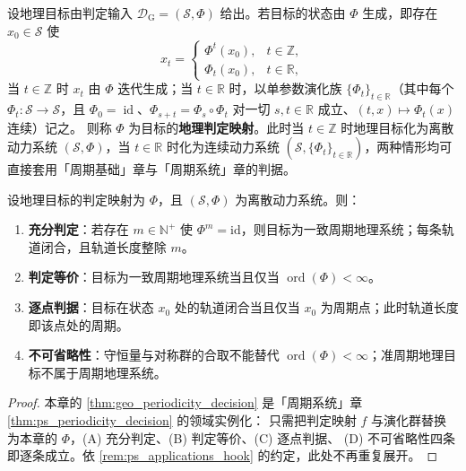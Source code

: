 \begin{definition}[地理判定映射]\label{def:geo_periodization}
设地理目标由判定输入 $\mathcal D_{\mathrm{G}}=(\mathcal S,\Phi)$ 给出。若目标的状态由 $\Phi$ 生成，即存在 $x_0\in\mathcal S$ 使
\[
x_t=\begin{cases}\Phi^t(x_0), & t\in\mathbb Z,\\ \Phi_t(x_0), & t\in\mathbb R,\end{cases}
\]
当 $t\in\mathbb Z$ 时 $x_t$ 由 $\Phi$ 迭代生成；当 $t\in\mathbb R$ 时，以单参数演化族 $\{\Phi_t\}_{t\in\mathbb R}$（其中每个 $\Phi_t:\mathcal S\to\mathcal S$，且 $\Phi_0=\operatorname{id}$、$\Phi_{s+t}=\Phi_s\circ\Phi_t$ 对一切 $s,t\in\mathbb R$ 成立、$(t,x)\mapsto\Phi_t(x)$ 连续）记之。
则称 $\Phi$ 为目标的\textbf{地理判定映射}。此时当 $t\in\mathbb Z$ 时地理目标化为离散动力系统 $(\mathcal S,\Phi)$，当 $t\in\mathbb R$ 时化为连续动力系统 $(\mathcal S,\{\Phi_t\}_{t\in\mathbb R})$，两种情形均可直接套用「周期基础」章与「周期系统」章的判据。
\end{definition}

\begin{theorem}[地理周期性判定定理]\label{thm:geo_periodicity_decision}
设地理目标的判定映射为 $\Phi$，且 $(\mathcal S,\Phi)$ 为离散动力系统。则：
\begin{enumerate}[label=(\Alph*)]
    \item \textbf{充分判定}：若存在 $m\in\mathbb N^+$ 使 $\Phi^m=\mathrm{id}$，则目标为一致周期地理系统；每条轨道闭合，且轨道长度整除 $m$。
    \item \textbf{判定等价}：目标为一致周期地理系统当且仅当 $\operatorname{ord}(\Phi)<\infty$。
    \item \textbf{逐点判据}：目标在状态 $x_0$ 处的轨道闭合当且仅当 $x_0$ 为周期点；此时轨道长度即该点处的周期。
    \item \textbf{不可省略性}：守恒量与对称群的合取不能替代 $\operatorname{ord}(\Phi)<\infty$；准周期地理目标不属于周期地理系统。
\end{enumerate}
\end{theorem}

\begin{proof}
本章的 \cref{thm:geo_periodicity_decision} 是「周期系统」章 \cref{thm:ps_periodicity_decision} 的领域实例化：
只需把判定映射 $f$ 与演化群替换为本章的 $\Phi$，(A) 充分判定、(B) 判定等价、(C) 逐点判据、
(D) 不可省略性四条即逐条成立。依 \cref{rem:ps_applications_hook} 的约定，此处不再重复展开。
\end{proof}

